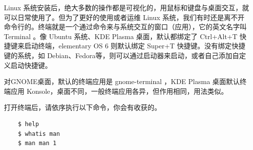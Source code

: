 \par Linux 系统安装后，绝大多数的操作都是可视化的，用鼠标和键盘与桌面交互，就可以日常使用了。但为了更好的使用或者运维 Linux 系统，我们有时还是离不开命令行的。终端就是一个通过命令来与系统交互的窗口（应用），它的英文名字叫 Terminal 。像 Ubuntu 系统、KDE Plasma 桌面，默认都绑定了 Ctrl+Alt+T 快捷键来启动终端，elementary OS 6 则默认绑定 Super+T 快捷键。没有绑定快捷键的系统，如 Debian、Fedora等，则可以通过启动器来启动，或者自己添加自定义启动快捷键。
\par 对GNOME桌面，默认的终端应用是 gnome-terminal ，KDE Plasma 桌面默认终端应用 Konsole，桌面不同，一般终端应用各异，但作用相同，用法类似。
\par 打开终端后，请依序执行以下命令，你会有收获的。
\begin{lstlisting}
    $ help
    $ whatis man
    $ man man 1
\end{lstlisting}


\ifx\all\undefined

\fi
